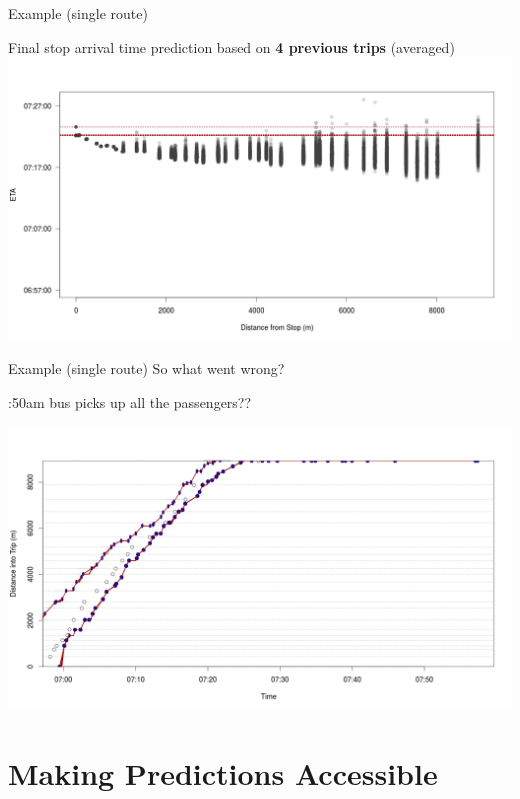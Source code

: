 \documentclass[10pt,t]{beamer}
\begin{document}
\begin{frame}{Example (single route)}
\begin{overprint}
    \vspace{2em}
     Final stop arrival time prediction based on \textbf{4 previous trips} (averaged)
    \centering
    \includegraphics[width=1\textwidth]{figs/r274/TRIP5_arrival_last_hist.png}
  \end{overprint}
\end{frame}


\begin{frame}{Example (single route)}
  So what went wrong?
  
  :50am bus picks up all the passengers??


  \centering
  \includegraphics[width=1\textwidth]{figs/r274/TRIP5_distance_traveled_comp.png}
\end{frame}



\section{Making Predictions Accessible}
\end{document}
